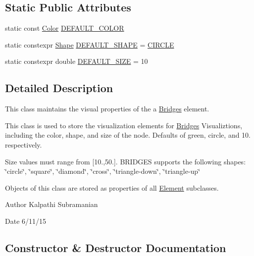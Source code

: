 \subsection*{Static Public Attributes}
\begin{DoxyCompactItemize}
\item 
static const \hyperlink{classbridges_1_1_color}{Color} \hyperlink{classbridges_1_1_element_visualizer_ade224640b18e3f6eed42098ea0ad5b3a}{D\+E\+F\+A\+U\+L\+T\+\_\+\+C\+O\+L\+O\+R}
\item 
static constexpr \hyperlink{namespacebridges_a1b4050586bd708782ae0d4f3b06b9579}{Shape} \hyperlink{classbridges_1_1_element_visualizer_a2800a212357180e4941a818b958aabd9}{D\+E\+F\+A\+U\+L\+T\+\_\+\+S\+H\+A\+P\+E} = \hyperlink{namespacebridges_a1b4050586bd708782ae0d4f3b06b9579aa968bf0f7aeccbae1a40751345bf2e64}{C\+I\+R\+C\+L\+E}
\item 
static constexpr double \hyperlink{classbridges_1_1_element_visualizer_a81cc788d6149d5d582099cbc35e18c5a}{D\+E\+F\+A\+U\+L\+T\+\_\+\+S\+I\+Z\+E} = 10
\end{DoxyCompactItemize}


\subsection{Detailed Description}
This class maintains the visual properties of the a \hyperlink{namespacebridges_1_1_bridges}{Bridges} element. 

This class is used to store the visualization elements for \hyperlink{namespacebridges_1_1_bridges}{Bridges} Visualiztions, including the color, shape, and size of the node. Defaults of green, circle, and 10. respectively.

Size values must range from \mbox{[}10.,50.\mbox{]}. B\+R\+I\+D\+G\+E\+S supports the following shapes\+: \char`\"{}circle\char`\"{}, \char`\"{}square\char`\"{}, \char`\"{}diamond\char`\"{}, \char`\"{}cross\char`\"{}, \char`\"{}triangle-\/down\char`\"{}, \char`\"{}triangle-\/up\char`\"{}

Objects of this class are stored as properties of all \hyperlink{classbridges_1_1_element}{Element} subclasses.

\begin{DoxyAuthor}{Author}
Kalpathi Subramanian 
\end{DoxyAuthor}
\begin{DoxyDate}{Date}
6/11/15 
\end{DoxyDate}


\subsection{Constructor \& Destructor Documentation}
\hypertarget{classbridges_1_1_element_visualizer_af792c8b0aaa76d07f5806df83f27ccb6}{}
